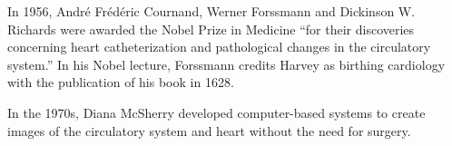 In 1956, André Frédéric Cournand, Werner Forssmann and Dickinson W. Richards were awarded the Nobel Prize in Medicine ``for their discoveries concerning heart catheterization and pathological changes in the circulatory system.'' In his Nobel lecture, Forssmann credits Harvey as birthing cardiology with the publication of his book in 1628.

In the 1970s, Diana McSherry developed computer-based systems to create images of the circulatory system and heart without the need for surgery.


